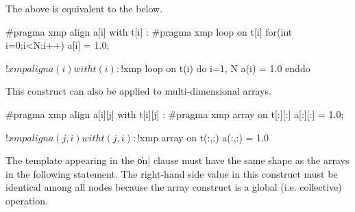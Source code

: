 The above is equivalent to the below.

\begin{XCexample}
#pragma xmp align a[i] with t[i]
  :
#pragma xmp loop on t[i]
for(int i=0;i<N;i++)
  a[i] = 1.0;
\end{XCexample}

\begin{XFexample}
!$xmp align a(i) with t(i)
  :
!$xmp loop on t(i)
do i=1, N
  a(i) = 1.0
enddo
\end{XFexample}

This construct can also be applied to multi-dimensional arrays.

\begin{XCexample}
#pragma xmp align a[i][j] with t[i][j]
  :
#pragma xmp array on t[:][:]
a[:][:] = 1.0;
\end{XCexample}

\begin{XFexample}
!$xmp align a(j,i) with t(j,i)
  :
!$xmp array on t(:,:)
a(:,:) = 1.0
\end{XFexample}

\begin{mynote}
  The template appearing in the \|on| clause must have the same shape as
  the arrays in the following statement. The right-hand side value in
  this construct must be identical among all nodes because the array
  construct is a global (i.e. collective) operation.
\end{mynote}
